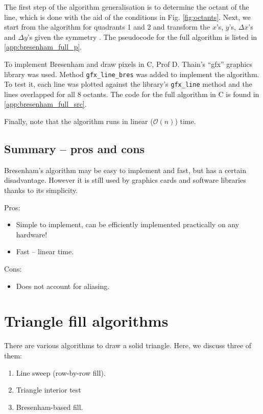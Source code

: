 \documentclass[a4paper]{article}
\begin{document}
The first step of the algorithm generalisation is to determine the octant of the line, which is done with the aid of the conditions in Fig. \ref{fig:octants}. Next, we start from the algorithm for quadrants 1 and 2 and transform the $x$'s, $y$'s, $\Delta x$'s and $\Delta y$'s given the symmetry . The pseudocode for the full algorithm is listed in \ref{app:bresenham_full_p}.

To implement Bresenham and draw pixels in C, Prof D. Thain's ``gfx'' graphics library \cite{thain} was used. Method \texttt{gfx\_line\_bres} was added to implement the algorithm. To test it, each line was plotted against the library's \texttt{gfx\_line} method and the lines overlapped for all 8 octants. The code for the full algorithm in C is found in \ref{app:bresenham_full_src}.

Finally, note that the algorithm runs in linear ($\mathcal{O}(n)$) time.


\subsection{Summary -- pros and cons}
Bresenham's algorithm may be easy to implement and fast, but has a certain disadvantage. However it is still used by graphics cards and software libraries \cite{bhowmick} thanks to its simplicity.

Pros:
\begin{itemize}
	\item Simple to implement, can be efficiently implemented practically on any hardware!
	\item Fast -- linear time.
\end{itemize}
Cons:
\begin{itemize}
	\item Does not account for aliasing.
\end{itemize}


\clearpage
\section{Triangle fill algorithms}

There are various algorithms to draw a solid triangle. Here, we discuss three of them:
\begin{enumerate}
    \item Line sweep (row-by-row fill).
    \item Triangle interior test
    \item Bresenham-based fill.
\end{enumerate}
\end{document}
